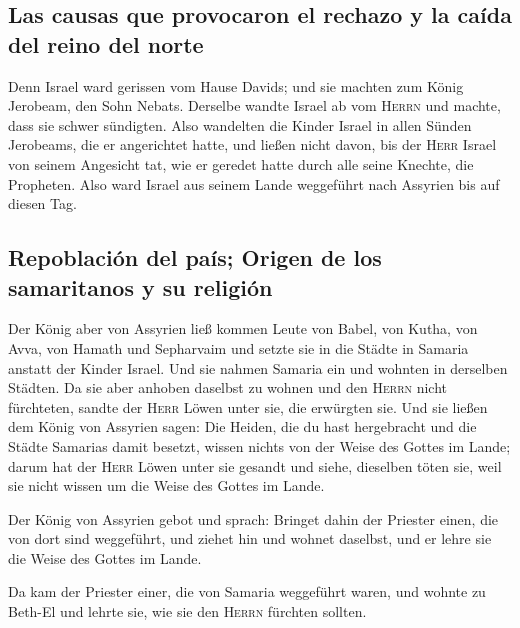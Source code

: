 \hypertarget{las-causas-que-provocaron-el-rechazo-y-la-cauxedda-del-reino-del-norte}{%
\subsection{Las causas que provocaron el rechazo y la caída del reino
del
norte}\label{las-causas-que-provocaron-el-rechazo-y-la-cauxedda-del-reino-del-norte}}

 Denn Israel ward gerissen vom Hause Davids; und sie
machten zum König Jerobeam, den Sohn Nebats. Derselbe wandte Israel ab
vom \textsc{Herrn} und machte, dass sie schwer sündigten.
 Also wandelten die Kinder Israel in allen Sünden
Jerobeams, die er angerichtet hatte, und ließen nicht davon,
 bis der \textsc{Herr} Israel von seinem Angesicht tat,
wie er geredet hatte durch alle seine Knechte, die Propheten. Also ward
Israel aus seinem Lande weggeführt nach Assyrien bis auf diesen Tag.

\hypertarget{repoblaciuxf3n-del-pauxeds-origen-de-los-samaritanos-y-su-religiuxf3n}{%
\subsection{Repoblación del país; Origen de los samaritanos y su
religión}\label{repoblaciuxf3n-del-pauxeds-origen-de-los-samaritanos-y-su-religiuxf3n}}

 Der König aber von Assyrien ließ kommen Leute von Babel,
von Kutha, von Avva, von Hamath und Sepharvaim und setzte sie in die
Städte in Samaria anstatt der Kinder Israel. Und sie nahmen Samaria ein
und wohnten in derselben Städten.  Da sie aber anhoben
daselbst zu wohnen und den \textsc{Herrn} nicht fürchteten, sandte der
\textsc{Herr} Löwen unter sie, die erwürgten sie.  Und
sie ließen dem König von Assyrien sagen: Die Heiden, die du hast
hergebracht und die Städte Samarias damit besetzt, wissen nichts von der
Weise des Gottes im Lande; darum hat der \textsc{Herr} Löwen unter sie
gesandt und siehe, dieselben töten sie, weil sie nicht wissen um die
Weise des Gottes im Lande.

 Der König von Assyrien gebot und sprach: Bringet dahin
der Priester einen, die von dort sind weggeführt, und ziehet hin und
wohnet daselbst, und er lehre sie die Weise des Gottes im Lande.

 Da kam der Priester einer, die von Samaria weggeführt
waren, und wohnte zu Beth-El und lehrte sie, wie sie den \textsc{Herrn}
fürchten sollten.

